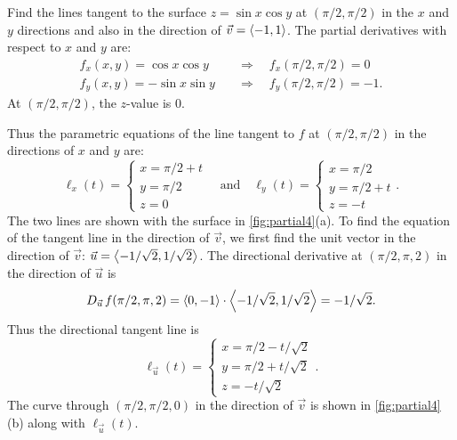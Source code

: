 
\begin{example}\label{ex_tpl1}%
Find the lines tangent to the surface $z=\sin x\cos y$ at $(\pi/2,\pi/2)$ in the $x$ and $y$ directions and also in the direction of $\vec v =\left\langle -1,1\right\rangle$.
\solution
The partial derivatives with respect to $x$ and $y$ are:
\begin{align*}
f_x(x,y) = \cos x\cos y\quad &\Rightarrow \quad f_x(\pi/2,\pi/2) = 0\\
f_y(x,y) = -\sin x\sin y\quad&\Rightarrow \quad f_y(\pi/2,\pi/2)=-1.
\end{align*}
At $(\pi/2,\pi/2)$, the $z$-value is 0.

Thus the parametric equations of the line tangent to $f$ at $(\pi/2,\pi/2)$ in the directions of $x$  and $y$ are:
%
%
\[
\ell_x(t) = \begin{cases}x=\pi/2 + t\\ y=\pi/2 \\z=0 \end{cases}
\quad \text{and}\quad 
\ell_y(t) = \begin{cases}x=\pi/2 \\ y=\pi/2+t \\z=-t \end{cases}.
\]
The two lines are shown with the surface in \autoref{fig:partial4}(a). To find the equation of the tangent line in the direction of $\vec v$, we first find the unit vector in the direction of $\vec v$: $\vec u =\left\langle -1/\sqrt{2},1/\sqrt{2}\right\rangle$. The directional derivative at $(\pi/2,\pi,2)$ in the direction of $\vec u$ is 
\[D_{\vec u\,}f(\pi/2,\pi,2) =\left\langle 0,-1\right\rangle\cdot\left\langle -1/\sqrt{2},1/\sqrt 2\right\rangle= -1/\sqrt 2.\]
Thus the directional tangent line is 
\[\ell_{\vec u}(t) = \begin{cases}x= \pi/2 -t/\sqrt{2}\\ y = \pi/2 + t/\sqrt{2} \\ z= -t/\sqrt{2}\end{cases}.\]
The curve through $(\pi/2,\pi/2,0)$ in the direction of $\vec v$ is shown in \autoref{fig:partial4}(b) along with $\ell_{\vec u}(t)$.
\end{example}

